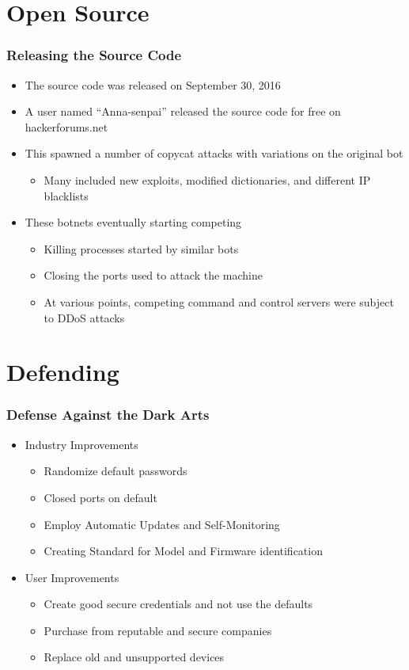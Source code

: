 \documentclass{beamer}
\begin{document}
\section{Open Source}

\begin{frame}
	\frametitle{Releasing the Source Code}
	\begin{itemize}
		\item<+-> The source code was released on September 30, 2016
		\item<+-> A user named ``Anna-senpai'' released the source code for free on hackerforums.net
		\item<+-> This spawned a number of copycat attacks with variations on the original bot
		\begin{itemize}
			\item<+-> Many included new exploits, modified dictionaries, and different IP blacklists
		\end{itemize}
		\item<+-> These botnets eventually starting competing
		\begin{itemize}
			\item<+-> Killing processes started by similar bots
			\item<+-> Closing the ports used to attack the machine
			\item<+-> At various points, competing command and control servers were subject to DDoS attacks
		\end{itemize}
	\end{itemize}
\end{frame}

\section{Defending}

\begin{frame}
    \frametitle{Defense Against the Dark Arts}
    \begin{itemize}
        \item<+-> Industry Improvements
            \begin{itemize}
                \item<+-> Randomize default passwords
                \item<+-> Closed ports on default
                \item<+-> Employ Automatic Updates and Self-Monitoring
                \item<+-> Creating Standard for Model and Firmware identification
            \end{itemize}
        \item<+-> User Improvements
            \begin{itemize}
                \item<+-> Create good secure credentials and not use the defaults
                \item<+-> Purchase from reputable and secure companies
                \item<+-> Replace old and unsupported devices
            \end{itemize}
    \end{itemize}
\end{frame}
\end{document}

